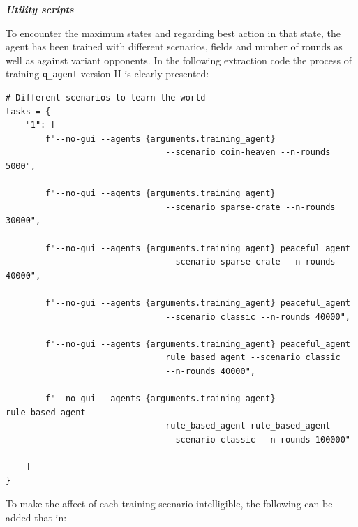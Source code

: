 \documentclass{article}
\begin{document}
\textbf{\textit{Utility scripts}}

To encounter the maximum states and regarding best action in that state, the agent has been trained with different scenarios, fields and number of rounds as well as against variant opponents. In the following extraction code the process of training \texttt{q\_agent} version II is clearly presented:

\begin{verbatim}
# Different scenarios to learn the world
tasks = {
    "1": [
        f"--no-gui --agents {arguments.training_agent} 
                                --scenario coin-heaven --n-rounds 5000",
        
        f"--no-gui --agents {arguments.training_agent} 
                                --scenario sparse-crate --n-rounds 30000",
        
        f"--no-gui --agents {arguments.training_agent} peaceful_agent 
                                --scenario sparse-crate --n-rounds 40000",
                                
        f"--no-gui --agents {arguments.training_agent} peaceful_agent 
                                --scenario classic --n-rounds 40000",
                                
        f"--no-gui --agents {arguments.training_agent} peaceful_agent 
                                rule_based_agent --scenario classic 
                                --n-rounds 40000",
                                
        f"--no-gui --agents {arguments.training_agent} rule_based_agent 
                                rule_based_agent rule_based_agent 
                                --scenario classic --n-rounds 100000"

    ]
}
\end{verbatim}

To make the affect of each training scenario intelligible, the following can be added that in:
\end{document}
